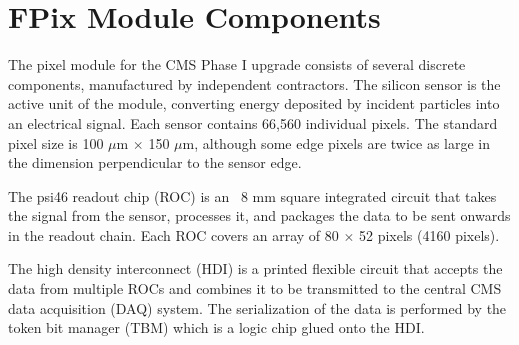\section{FPix Module Components}
\label{s:components}

The pixel module for the CMS Phase I upgrade consists of several discrete components, manufactured by independent contractors.  
The silicon sensor is the active unit of the module, converting energy deposited by incident particles into an electrical signal.  
Each sensor contains 66,560 individual pixels.  
The standard pixel size is 100 $\mu$m $\times$ 150 $\mu$m, although some edge pixels are twice as large in the dimension perpendicular to the sensor edge.  

The psi46 readout chip (ROC) is an ~8 mm square integrated circuit that takes the signal from the sensor, 
processes it, and packages the data to be sent onwards in the readout chain.  
Each ROC covers an array of 80 $\times$ 52 pixels (4160 pixels).  

The high density interconnect (HDI) is a printed flexible circuit that accepts the data from multiple ROCs 
and combines it to be transmitted to the central CMS data acquisition (DAQ) system.  
The serialization of the data is performed by the token bit manager (TBM) which is a logic chip glued onto the HDI.
